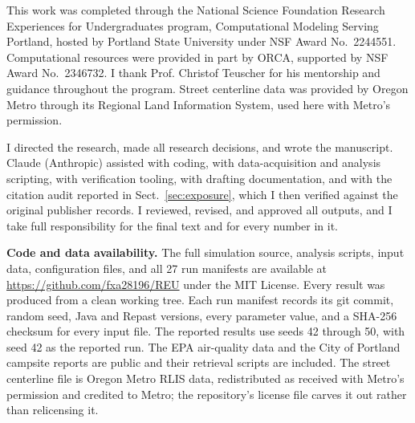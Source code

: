 \documentclass[graybox]{svmult}
\newcommand{\orcaack}{ Computational resources were provided in part by ORCA, supported by NSF Award No.~2346732.}
\begin{document}
\begin{acknowledgement}
This work was completed through the National Science Foundation Research
Experiences for Undergraduates program, Computational Modeling Serving Portland,
hosted by Portland State University under NSF Award No.~2244551.\orcaack{} I
thank Prof. Christof Teuscher for his mentorship and guidance throughout the
program. Street centerline data was provided by Oregon Metro through its
Regional Land Information System, used here with Metro's permission.

I directed the research, made all research decisions, and wrote the manuscript.
Claude (Anthropic) assisted with coding, with data-acquisition and analysis
scripting, with verification tooling, with drafting documentation, and with the
citation audit reported in Sect.~\ref{sec:exposure}, which I then verified
against the original publisher records. I reviewed, revised, and approved all
outputs, and I take full responsibility for the final text and for every number
in it.
\end{acknowledgement}

\noindent\textbf{Code and data availability.} The full simulation source,
analysis scripts, input data, configuration files, and all 27 run manifests are
available at \url{https://github.com/fxa28196/REU} under the MIT License. Every
result was produced from a clean working tree. Each run manifest records its git
commit, random seed, Java and Repast versions, every parameter value, and a
SHA-256 checksum for every input file. The reported results use seeds 42 through
50, with seed 42 as the reported run. The EPA air-quality data and the City of
Portland campsite reports are public and their retrieval scripts are included.
The street centerline file is Oregon Metro RLIS data, redistributed as received
with Metro's permission and credited to Metro; the repository's license file
carves it out rather than relicensing it.
\end{document}
